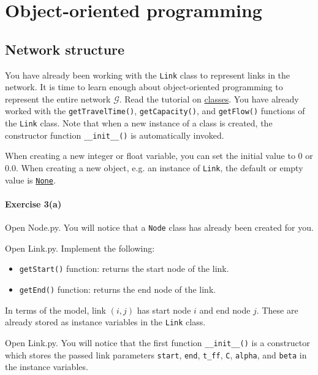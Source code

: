 \documentclass[11pt]{article}
\begin{document}
	
\section{Object-oriented programming}

\subsection{Network structure}

\label{sec31}
	
You have already been working with the \texttt{Link} class to represent links in the network. It is time to learn enough about object-oriented programming to represent the entire network $\mathcal{G}$. Read the tutorial on \href{https://www.w3schools.com/python/python_classes.asp}{classes}. You have already worked with the \texttt{getTravelTime()}, \texttt{getCapacity()}, and \texttt{getFlow()} functions of the \texttt{Link} class. 
Note that when a new instance of a class is created, the constructor function \texttt{\_\_init\_\_()} is automatically invoked. 

When creating a new integer or float variable, you can set the initial value to 0 or 0.0. When creating a new object, e.g. an instance of \texttt{Link}, the default or empty value is \href{https://www.w3schools.com/python/ref_keyword_none.asp}{\texttt{None}}. 
 
 
 \paragraph*{Exercise 3(a)} Open Node.py. You will notice that a \texttt{Node} class has already been created for you.
 
 Open Link.py. Implement the following:
 \begin{itemize}
 	\item \texttt{getStart()} function: returns the start node of the link.
 	\item  \texttt{getEnd()} function: returns the end node of the link.
 \end{itemize} 
 In terms of the model, link $(i,j)$ has start node $i$ and end node $j$. These are already stored as instance variables in the \texttt{Link} class. 

Open Link.py. You will notice that the first function \texttt{\_\_init\_\_()} is a constructor which stores the passed link parameters \texttt{start}, \texttt{end}, \texttt{t\_ff}, \texttt{C}, \texttt{alpha}, and \texttt{beta} in the instance variables. 
\end{document}
